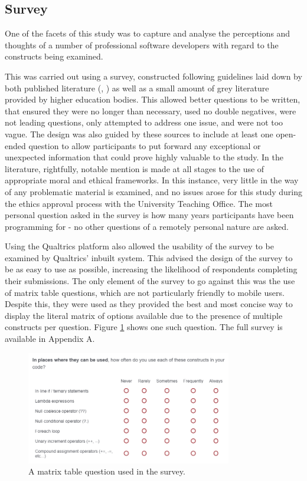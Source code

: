 \documentclass{article}
\begin{document}
    \subsection{Survey}
    \label{subsec:survey}
        One of the facets of this study was to capture and analyse the perceptions and thoughts of a number of professional software developers with regard to the constructs being examined.
        
        This was carried out using a survey, constructed following guidelines laid down by both published literature (\cite{goodSurveys1}, \cite{goodSurveys2}) as well as a small amount of grey literature provided by higher education bodies. This allowed better questions to be written, that ensured they were no longer than necessary, used no double negatives, were not leading questions, only attempted to address one issue, and were not too vague. The design was also guided by these sources to include at least one open-ended question to allow participants to put forward any exceptional or unexpected information that could prove highly valuable to the study. In the literature, rightfully, notable mention is made at all stages to the use of appropriate moral and ethical frameworks. In this instance, very little in the way of any problematic material is examined, and no issues arose for this study during the ethics approval process with the University Teaching Office. The most personal question asked in the survey is how many years participants have been programming for - no other questions of a remotely personal nature are asked.

        Using the Qualtrics platform also allowed the usability of the survey to be examined by Qualtrics' inbuilt system. This advised the design of the survey to be as easy to use as possible, increasing the likelihood of respondents completing their submissions. The only element of the survey to go against this was the use of matrix table questions, which are not particularly friendly to mobile users. Despite this, they were used as they provided the best and most concise way to display the literal matrix of options available due to the presence of multiple constructs per question. Figure \ref{fig:matrixTable} shows one such question. The full survey is available in Appendix A.
        
        \begin{figure}[htbp]
            \centering
            \includegraphics[width=0.8\textwidth]{matrixTable}
            \caption{A matrix table question used in the survey.}
            \label{fig:matrixTable}
        \end{figure}
\end{document}
